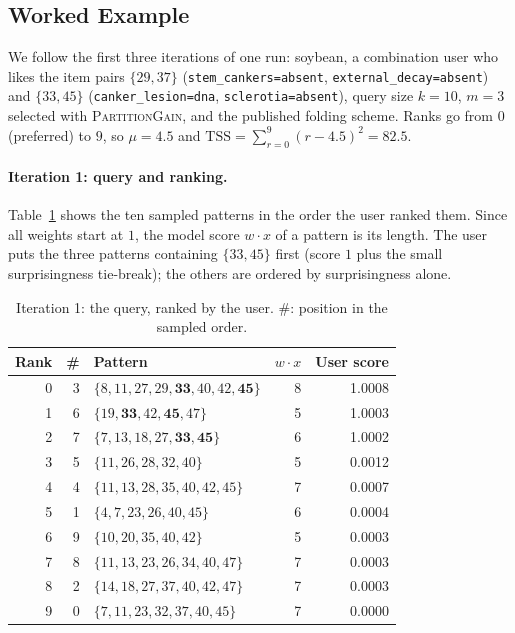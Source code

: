 
\subsection{Worked Example}
\label{subsec:worked_example}

We follow the first three iterations of one run: soybean, a combination user who likes the item pairs
$\{29, 37\}$ (\texttt{stem\_cankers=absent}, \texttt{external\_decay=absent}) and $\{33, 45\}$
(\texttt{canker\_lesion=dna}, \texttt{sclerotia=absent}), query size $k = 10$, $m = 3$ selected with
\textsc{PartitionGain}, and the published folding scheme. Ranks go from $0$ (preferred) to $9$, so
$\mu = 4.5$ and $\mathrm{TSS} = \sum_{r=0}^{9} (r - 4.5)^2 = 82.5$.

\paragraph{Iteration 1: query and ranking.}
Table~\ref{tab:ex_query1} shows the ten sampled patterns in the order the user ranked them. Since all
weights start at $1$, the model score $w \cdot x$ of a pattern is its length. The user puts the three patterns
containing $\{33, 45\}$ first (score $1$ plus the small surprisingness tie-break); the others are ordered by
surprisingness alone.

\begin{table}[t]
\centering
\caption{Iteration 1: the query, ranked by the user. \#: position in the sampled order.}
\label{tab:ex_query1}
\small
\begin{tabular}{rrlrr}
\toprule
Rank & \# & Pattern & $w \cdot x$ & User score \\
\midrule
0 & 3 & $\{8,11,27,29,\mathbf{33},40,42,\mathbf{45}\}$ & 8 & 1.0008 \\
1 & 6 & $\{19,\mathbf{33},42,\mathbf{45},47\}$          & 5 & 1.0003 \\
2 & 7 & $\{7,13,18,27,\mathbf{33},\mathbf{45}\}$        & 6 & 1.0002 \\
3 & 5 & $\{11,26,28,32,40\}$                            & 5 & 0.0012 \\
4 & 4 & $\{11,13,28,35,40,42,45\}$                      & 7 & 0.0007 \\
5 & 1 & $\{4,7,23,26,40,45\}$                           & 6 & 0.0004 \\
6 & 9 & $\{10,20,35,40,42\}$                            & 5 & 0.0003 \\
7 & 8 & $\{11,13,23,26,34,40,47\}$                      & 7 & 0.0003 \\
8 & 2 & $\{14,18,27,37,40,42,47\}$                      & 7 & 0.0003 \\
9 & 0 & $\{7,11,23,32,37,40,45\}$                       & 7 & 0.0000 \\
\bottomrule
\end{tabular}
\end{table}

